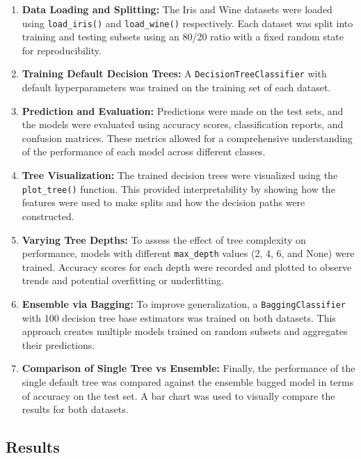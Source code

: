 \documentclass[a4paper,12pt]{article}
\begin{document}
\begin{enumerate}
    \item \textbf{Data Loading and Splitting:} The Iris and Wine datasets were loaded using \texttt{load\_iris()} and \texttt{load\_wine()} respectively. Each dataset was split into training and testing subsets using an 80/20 ratio with a fixed random state for reproducibility.
    
    \item \textbf{Training Default Decision Trees:} A \texttt{DecisionTreeClassifier} with default hyperparameters was trained on the training set of each dataset.
    
    \item \textbf{Prediction and Evaluation:} Predictions were made on the test sets, and the models were evaluated using accuracy scores, classification reports, and confusion matrices. These metrics allowed for a comprehensive understanding of the performance of each model across different classes.
    
    \item \textbf{Tree Visualization:} The trained decision trees were visualized using the \texttt{plot\_tree()} function. This provided interpretability by showing how the features were used to make splits and how the decision paths were constructed.
    
    \item \textbf{Varying Tree Depths:} To assess the effect of tree complexity on performance, models with different \texttt{max\_depth} values (2, 4, 6, and None) were trained. Accuracy scores for each depth were recorded and plotted to observe trends and potential overfitting or underfitting.
    
    \item \textbf{Ensemble via Bagging:} To improve generalization, a \texttt{BaggingClassifier} with 100 decision tree base estimators was trained on both datasets. This approach creates multiple models trained on random subsets and aggregates their predictions.
    
    \item \textbf{Comparison of Single Tree vs Ensemble:} Finally, the performance of the single default tree was compared against the ensemble bagged model in terms of accuracy on the test set. A bar chart was used to visually compare the results for both datasets.
\end{enumerate}




\subsection{Results}
\end{document}
